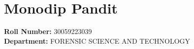 \section*{Monodip Pandit}
\textbf{Roll Number:} 30059223039 \\
\textbf{Department:} FORENSIC SCIENCE AND TECHNOLOGY


